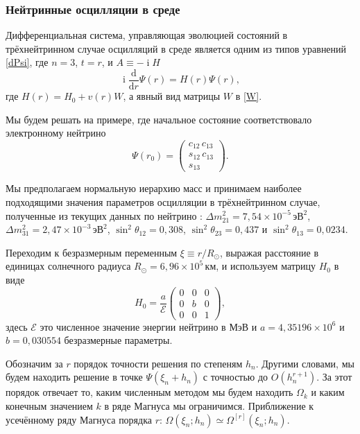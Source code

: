 \documentclass[12pt]{article}
\DeclareMathOperator\Iunit{i}
\renewcommand\imath\Iunit
\begin{document}
\subsubsection{Нейтринные осцилляции в среде}

Дифференциальная система, управляющая эволюцией состояний в трёхнейтринном
случае осцилляций в среде является одним из типов уравнений \eqref{dPsi}, где
$n=3$, $t=r$, и $A\equiv -\imath H$
\begin{equation}
  \imath\frac{\text{d}}{\text{d}r}\Psi(r)=H(r)\Psi(r),
\end{equation}
где $H(r)=H_0 + v(r)W$, а явный вид матрицы $W$ в \eqref{W}.

Мы будем решать на примере, где начальное состояние соответствовало электронному
нейтрино
\begin{equation}
  \Psi(r_0)=
  \begin{pmatrix}
    c_{12}\, c_{13}\\
    s_{12}\, c_{13}\\
    s_{13}
  \end{pmatrix}.
\end{equation}

Мы предполагаем нормальную иерархию масс и принимаем наиболее подходящими
значения параметров осцилляции в трёхнейтринном случае, полученные из текущих
данных по нейтрино %
:
\(\Delta m^2_{21}=7{,}54\times 10^{-5}\,\text{эВ}^2\), \(\Delta m^2_{31}=2{,}47 \times
10^{-3}\,\text{эВ}^2\), \(\sin^2\theta_{12}=0{,}308\), \(\sin^2\theta_{23}=0{,}437\) и
\(\sin^2\theta_{13}=0{,}0234\).

Переходим к безразмерным переменным $\xi\equiv r/R_\odot$, выражая расстояние в
единицах солнечного радиуса \(R_\odot=6{,}96\times10^5\,\text{км}\), и
используем матрицу $H_0$ в виде
\begin{equation}
  H_0=\frac{a}{\mathcal{E}}
  \begin{pmatrix}
    0& 0& 0\\
    0& b& 0\\
    0& 0& 1
  \end{pmatrix},
\end{equation}
здесь $\mathcal{E}$ это численное значение энергии нейтрино в \(\text{МэВ}\) и
$a=4{,}35196\times 10^6$ и $b=0{,}030554$ безразмерные параметры.

Обозначим за $r$ порядок точности решения по степеням $h_n$. Другими словами, мы
будем находить решение в точке $\Psi(\xi_n+h_n)$ с точностью до
$O(h^{r+1}_n)$. За этот порядок отвечает то, каким численным методом мы будем
находить $\Omega_k$ и каким конечным значением $k$ в ряде Магнуса мы
ограничимся. Приближение к усечённому ряду Магнуса порядка $r$:
$\Omega(\xi_n;h_n)\simeq \Omega^{[r]}(\xi_n;h_n)$.
\end{document}
